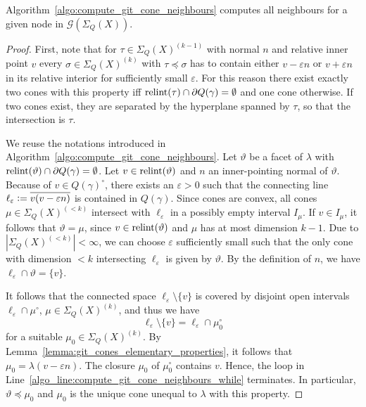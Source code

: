 \begin{prop}
	Algorithm~\ref{algo:compute_git_cone_neighbours} computes all neighbours for a given node in $\mathcal{G}(\Sigma_Q(X))$.
\end{prop}

\begin{proof}
	First, note that for $\tau\in\Sigma_Q(X)^{(k-1)}$ with normal $n$ and relative inner point $v$ every $\sigma\in\Sigma_Q(X)^{(k)}$ with $\tau\preceq\sigma$ has to contain either $v-\varepsilon n$ or $v+\varepsilon n$ in its relative interior for sufficiently small $\varepsilon$. For this reason there exist exactly two cones with this property iff $\text{relint}(\tau)\cap\partial Q(\gamma) = \emptyset$ and one cone otherwise. If two cones exist, they are separated by the hyperplane spanned by $\tau$, so that the intersection is $\tau$.
	
	We reuse the notations introduced in Algorithm~\ref{algo:compute_git_cone_neighbours}. Let $\vartheta$ be a facet of $\lambda$ with $\text{relint}(\vartheta)\cap\partial Q(\gamma) = \emptyset$.
	Let $v\in\text{relint}(\vartheta)$ and $n$ an inner-pointing normal of $\vartheta$. Because of $v\in Q(\gamma)^\circ$, there exists an $\varepsilon > 0$ such that the connecting line $\ell_\varepsilon \mathrel{\mathop:}= \overline{v(v-\varepsilon n)}$ is contained in $Q(\gamma)$. Since cones are convex, all cones $\mu\in\Sigma_Q(X)^{(<k)}$ intersect with $\ell_\varepsilon$ in a possibly empty interval $I_\mu$. If $v\in I_\mu$, it follows that $\vartheta = \mu$, since $v\in\text{relint}(\vartheta)$ and $\mu$ has at most dimension $k-1$. Due to $|\Sigma_Q(X)^{(<k)}| < \infty$, we can choose $\varepsilon$ sufficiently small such that the only cone with dimension $<k$ intersecting $\ell_\varepsilon$ is given by $\vartheta$. By the definition of $n$, we have $\ell_\varepsilon \cap \vartheta = \{v\}$.
	
	It follows that the connected space $\ell_\varepsilon \setminus \{v\}$ is covered by disjoint open intervals $\ell_\varepsilon \cap \mu^\circ$, $\mu\in\Sigma_Q(X)^{(k)}$, and thus we have $$\ell_\varepsilon \setminus \{v\} = \ell_\varepsilon \cap \mu_0^\circ$$
	for a suitable $\mu_0\in\Sigma_Q(X)^{(k)}$. By Lemma~\ref{lemma:git_cones_elementary_properties}, it follows that $\mu_0 = \lambda(v-\varepsilon n)$. The closure $\mu_0$ of $\mu_0^\circ$ contains $v$. Hence, the loop in Line~\ref{algo_line:compute_git_cone_neighbours_while} terminates. In particular, $\vartheta\preceq\mu_0$ and $\mu_0$ is the unique cone unequal to $\lambda$ with this property.
\end{proof}


